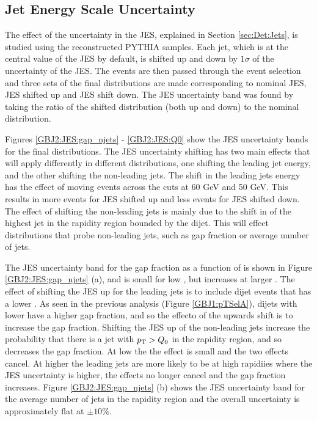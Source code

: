 \subsection{Jet Energy Scale Uncertainty}

The effect of the uncertainty in the JES, explained in Section \ref{sec:Det:Jets}, is studied using the reconstructed PYTHIA samples.
Each jet, which is at the central value of the JES by default, is shifted up and down by $1 \sigma$ of the uncertainty of the JES.
The events are then passed through the event selection and three sets of the final distributions are made corresponding to nominal JES,  JES shifted up and JES shift down.
The JES uncertainty band was found by taking the ratio of the shifted distribution (both up and down) to the nominal distribution.


Figures \ref{GBJ2:JES:gap_njets} - \ref{GBJ2:JES:Q0} show the JES uncertainty bands for the final distributions.
The JES uncertainty shifting has two main effects that will apply differently in different distributions, one shifting the leading jet energy, and the other shifting the non-leading jets.
The shift in the leading jets energy has the effect of moving events across the \pt{} cuts at 60 GeV and 50 GeV.
This results in more events for JES shifted up and less events for JES shifted down. 
The effect of shifting the non-leading jets is mainly due to the shift in \pt{} of the highest \pt{} jet in the rapidity region bounded by the dijet. 
This will effect distributions that probe non-leading jets, such as gap fraction or average number of jets. 

The JES uncertainty band for the gap fraction as a function of \dy{} is shown in Figure \ref{GBJ2:JES:gap_njets} (a), and is small for low \dy{}, but increases at larger \dy{}.
The effect of shifting the JES up for the leading jets is to include dijet events that has a lower \ptb{}. 
As seen in the previous analysis (Figure \ref{GBJ1:pTSelA}), dijets with lower \ptb{} have a higher gap fraction, and so the effecto of the upwards shift is to increase the gap fraction.
Shifting the JES up of the non-leading jets increase the probability that there is a jet with $\mbox{$p_{\rm T}$}{}>Q_0$ in the rapidity region, and so decreases the gap fraction. 
At low \dy{} the the effect is small and the two effects cancel.
At higher \dy{} the leading jets are more likely to be at high rapidiies where the JES uncertainty is higher, the effects no longer cancel and the gap fraction increases.
Figure \ref{GBJ2:JES:gap_njets} (b) shows the JES uncertainty band for the average number of jets in the rapidity region and the overall uncertainty is approximately flat at $\pm 10 \%$.


